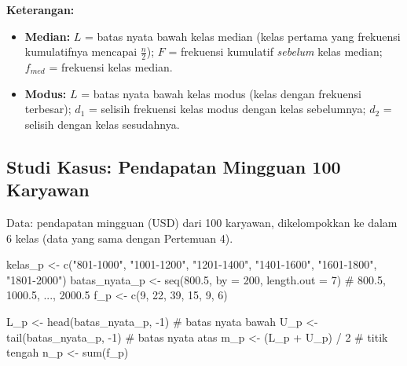 \documentclass[
  indonesian,
  letterpaper,
]{book}
\newenvironment{Shaded}{\begin{snugshade}}{\end{snugshade}}
\newcommand{\AttributeTok}[1]{\textcolor[rgb]{0.40,0.45,0.13}{#1}}
\newcommand{\CommentTok}[1]{\textcolor[rgb]{0.37,0.37,0.37}{#1}}
\newcommand{\DecValTok}[1]{\textcolor[rgb]{0.68,0.00,0.00}{#1}}
\newcommand{\FloatTok}[1]{\textcolor[rgb]{0.68,0.00,0.00}{#1}}
\newcommand{\FunctionTok}[1]{\textcolor[rgb]{0.28,0.35,0.67}{#1}}
\newcommand{\NormalTok}[1]{\textcolor[rgb]{0.00,0.23,0.31}{#1}}
\newcommand{\OtherTok}[1]{\textcolor[rgb]{0.00,0.23,0.31}{#1}}
\newcommand{\SpecialCharTok}[1]{\textcolor[rgb]{0.37,0.37,0.37}{#1}}
\newcommand{\StringTok}[1]{\textcolor[rgb]{0.13,0.47,0.30}{#1}}
\providecommand{\tightlist}{%
  \setlength{\itemsep}{0pt}\setlength{\parskip}{0pt}}
\begin{document}
\textbf{Keterangan:}

\begin{itemize}
\tightlist
\item
  \textbf{Median:} \(L\) = batas nyata bawah kelas median (kelas pertama
  yang frekuensi kumulatifnya mencapai \(\frac{n}{2}\)); \(F\) =
  frekuensi kumulatif \emph{sebelum} kelas median; \(f_{med}\) =
  frekuensi kelas median.
\item
  \textbf{Modus:} \(L\) = batas nyata bawah kelas modus (kelas dengan
  frekuensi terbesar); \(d_1\) = selisih frekuensi kelas modus dengan
  kelas sebelumnya; \(d_2\) = selisih dengan kelas sesudahnya.
\end{itemize}

\subsection{Studi Kasus: Pendapatan Mingguan 100
Karyawan}\label{studi-kasus-pendapatan-mingguan-100-karyawan}

Data: pendapatan mingguan (USD) dari 100 karyawan, dikelompokkan ke
dalam 6 kelas (data yang sama dengan Pertemuan 4).

\begin{Shaded}
\begin{Highlighting}[]
\NormalTok{kelas\_p }\OtherTok{\textless{}{-}} \FunctionTok{c}\NormalTok{(}\StringTok{"801{-}1000"}\NormalTok{, }\StringTok{"1001{-}1200"}\NormalTok{, }\StringTok{"1201{-}1400"}\NormalTok{, }\StringTok{"1401{-}1600"}\NormalTok{, }\StringTok{"1601{-}1800"}\NormalTok{, }\StringTok{"1801{-}2000"}\NormalTok{)}
\NormalTok{batas\_nyata\_p }\OtherTok{\textless{}{-}} \FunctionTok{seq}\NormalTok{(}\FloatTok{800.5}\NormalTok{, }\AttributeTok{by =} \DecValTok{200}\NormalTok{, }\AttributeTok{length.out =} \DecValTok{7}\NormalTok{)   }\CommentTok{\# 800.5, 1000.5, ..., 2000.5}
\NormalTok{f\_p }\OtherTok{\textless{}{-}} \FunctionTok{c}\NormalTok{(}\DecValTok{9}\NormalTok{, }\DecValTok{22}\NormalTok{, }\DecValTok{39}\NormalTok{, }\DecValTok{15}\NormalTok{, }\DecValTok{9}\NormalTok{, }\DecValTok{6}\NormalTok{)}

\NormalTok{L\_p }\OtherTok{\textless{}{-}} \FunctionTok{head}\NormalTok{(batas\_nyata\_p, }\SpecialCharTok{{-}}\DecValTok{1}\NormalTok{)   }\CommentTok{\# batas nyata bawah}
\NormalTok{U\_p }\OtherTok{\textless{}{-}} \FunctionTok{tail}\NormalTok{(batas\_nyata\_p, }\SpecialCharTok{{-}}\DecValTok{1}\NormalTok{)   }\CommentTok{\# batas nyata atas}
\NormalTok{m\_p }\OtherTok{\textless{}{-}}\NormalTok{ (L\_p }\SpecialCharTok{+}\NormalTok{ U\_p) }\SpecialCharTok{/} \DecValTok{2}           \CommentTok{\# titik tengah}
\NormalTok{n\_p }\OtherTok{\textless{}{-}} \FunctionTok{sum}\NormalTok{(f\_p)}
\end{Highlighting}
\end{Shaded}
\end{document}
